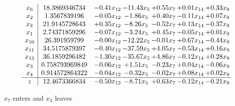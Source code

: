 \documentclass[9pt]{article}
\begin{document}
 \[\begin{array}{c| c c@{\hskip 2pt} c@{\hskip 2pt} c@{\hskip 2pt} c@{\hskip 2pt} c@{\hskip 2pt} }
 x_{6}   &  18.3869346734 & -0.41 x_{12} & -11.43 x_{5} & +  0.55 x_{7} & +  0.01 x_{14} & +  0.33 x_{9}\\
 x_{2}   &  1.3567839196 & -0.05 x_{12} & -1.86 x_{5} & +  0.40 x_{7} & -0.11 x_{14} & +  0.07 x_{9}\\
 x_{8}   &  21.9145728643 & +  0.35 x_{12} & -8.26 x_{5} & -0.52 x_{7} & +  0.13 x_{14} & -0.37 x_{9}\\
 x_{1}   &  2.74371859296 & -0.07 x_{12} & -3.24 x_{5} & +  0.45 x_{7} & -0.05 x_{14} & +  0.01 x_{9}\\
 x_{10}   &  26.391959799 & -0.00 x_{12} & -12.22 x_{5} & -0.01 x_{7} & +  0.67 x_{14} & -0.44 x_{9}\\
 x_{11}   &  34.5175879397 & -0.40 x_{12} & -37.59 x_{5} & +  4.05 x_{7} & -0.53 x_{14} & +  0.16 x_{9}\\
 x_{13}   &  36.1859296482 & -1.30 x_{12} & -35.67 x_{5} & +  4.86 x_{7} & -0.12 x_{14} & +  0.28 x_{9}\\
 x_{3}   &  0.758793969849 & -0.06 x_{12} & +  1.51 x_{5} & -0.23 x_{7} & +  0.04 x_{14} & -0.06 x_{9}\\
 x_{4}   &  0.914572864322 & -0.04 x_{12} & -0.32 x_{5} & -0.02 x_{7} & +  0.08 x_{14} & +  0.02 x_{9}\\
\hline
z    &  12.4673366834 & -0.50 x_{12} & -8.71 x_{5} & +  0.63 x_{7} & -0.12 x_{14} & -0.21 x_{9}\\
\end{array}\]


 $ x_{7} $ enters and $ x_{3} $ leaves 
\end{document}
